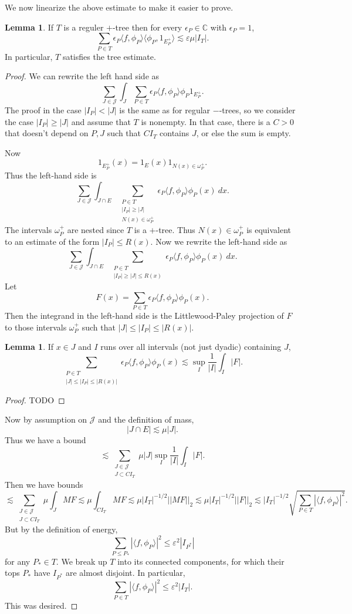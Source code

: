 \documentclass[12pt]{report}
\newcommand{\CC}{\mathbb{C}}
\theoremstyle{definition}
\newtheorem{lemma}[theorem]{Lemma}
\begin{document}
We now linearize the above estimate to make it easier to prove.
\begin{lemma}
If $T$ is a reguler $+$-tree then for every $\epsilon_P \in \CC$ with $\epsilon_P = 1$,
$$\sum_{P \in T} \epsilon_P \langle f, \phi_P\rangle \langle \phi_P, 1_{E_P^+}\rangle \lesssim \varepsilon \mu |I_T|.$$
In particular, $T$ satisfies the tree estimate.
\end{lemma}
\begin{proof}
We can rewrite the left hand side as
$$\sum_{J \in \mathcal J} \int_J \sum_{P \in T} \epsilon_P \langle f, \phi_P\rangle \phi_P 1_{E_P^+}.$$
The proof in the case $|I_P| < |J|$ is the same as for regular $-$-trees, so we consider the case $|I_P| \geq |J|$ and assume that $T$ is nonempty.
In that case, there is a $C > 0$ that doesn't depend on $P,J$ such that $CI_T$ contains $J$, or else the sum is empty.

Now
$$1_{E_P^+}(x) = 1_E(x)1_{N(x) \in \omega_P^+}.$$
Thus the left-hand side is
$$\sum_{J \in \mathcal J} \int_{J \cap E} \sum_{\substack{P \in T\\|I_P| \geq |J|\\N(x) \in \omega_P^+}} \epsilon_P \langle f, \phi_P\rangle \phi_P(x) ~dx.$$
The intervals $\omega_P^+$ are nested since $T$ is a $+$-tree.
Thus $N(x) \in \omega_P^+$ is equivalent to an estimate of the form $|I_P| \leq R(x)$.
Now we rewrite the left-hand side as
$$\sum_{J \in \mathcal J} \int_{J \cap E} \sum_{\substack{P \in T\\|I_P| \geq |J| \leq R(x)}} \epsilon_P \langle f, \phi_P\rangle \phi_P(x) ~dx.$$
Let
$$F(x) = \sum_{P \in T} \epsilon_P \langle f, \phi_P \rangle \phi_P(x).$$
Then the integrand in the left-hand side is the Littlewood-Paley projection of $F$ to those intervals $\omega_P^+$ such that $|J| \leq |I_P| \leq |R(x)|$.
\begin{lemma}
If $x \in J$ and $I$ runs over all intervals (not just dyadic) containing $J$,
$$\sum_{\substack{P \in T\\|J| \leq |I_P| \leq |R(x)|}} \epsilon_P \langle f, \phi_P\rangle \phi_P(x) \lesssim \sup_I \frac{1}{|I|} \int_I |F|.$$
\end{lemma}
\begin{proof}
TODO
\end{proof}
Now by assumption on $\mathcal J$ and the definition of mass,
$$|J \cap E| \lesssim \mu|J|.$$
Thus we have a bound
$$\lesssim \sum_{\substack{J \in \mathcal J\\J \subset CI_T}} \mu|J| \sup_I \frac{1}{|I|} \int_I |F|.$$
Then we have bounds
$$\lesssim \sum_{\substack{J \in \mathcal J\\J \subset CI_T}} \mu \int_J MF \lesssim \mu \int_{CI_T} MF \lesssim \mu|I_T|^{-1/2}||MF||_2 \lesssim \mu|I_T|^{-1/2}||F||_2 \lesssim |I_T|^{-1/2}\sqrt{\sum_{P \in T} |\langle f, \phi_P\rangle|^2 }.$$
But by the definition of energy,
$$\sum_{P \leq P_*} |\langle f, \phi_P\rangle|^2 \leq \varepsilon^2 |I_{P^*}|$$
for any $P_* \in T$.
We break up $T$ into its connected components, for which their tops $P_*$ have $I_{P^*}$ are almost disjoint.
In particular,
$$\sum_{P \in T} |\langle f, \phi_P\rangle|^2 \leq \varepsilon^2 |I_T|.$$
This was desired.
\end{proof}
\end{document}
